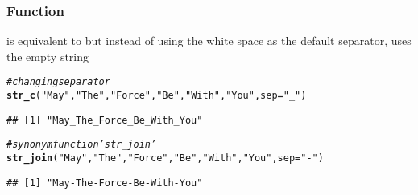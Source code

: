 \documentclass[12pt]{beamer}\usepackage[]{graphicx}\usepackage[]{color}
\makeatletter
\newcommand{\hlstr}[1]{\textcolor[rgb]{0.192,0.494,0.8}{#1}}%
\newcommand{\hlcom}[1]{\textcolor[rgb]{0.678,0.584,0.686}{\textit{#1}}}%
\newcommand{\hlstd}[1]{\textcolor[rgb]{0.345,0.345,0.345}{#1}}%
\newcommand{\hlkwc}[1]{\textcolor[rgb]{0.333,0.667,0.333}{#1}}%
\newcommand{\hlkwd}[1]{\textcolor[rgb]{0.737,0.353,0.396}{\textbf{#1}}}%
\newenvironment{kframe}{%
 \def\at@end@of@kframe{}%
 \ifinner\ifhmode%
  \def\at@end@of@kframe{\end{minipage}}%
  \begin{minipage}{\columnwidth}%
 \fi\fi%
 \def\FrameCommand##1{\hskip\@totalleftmargin \hskip-\fboxsep
 \colorbox{shadecolor}{##1}\hskip-\fboxsep
     \hskip-\linewidth \hskip-\@totalleftmargin \hskip\columnwidth}%
 \MakeFramed {\advance\hsize-\width
   \@totalleftmargin\z@ \linewidth\hsize
   \@setminipage}}%
 {\par\unskip\endMakeFramed%
 \at@end@of@kframe}
\newenvironment{knitrout}{}{} %
\makeatother
\begin{document}
\begin{frame}[fragile]
\frametitle{Function }

 is equivalent to  but instead of using the white space as the default separator,  uses the empty string 
\begin{knitrout}\footnotesize
{}\color{fgcolor}\begin{kframe}
\begin{alltt}
\hlcom{# changing separator}
\hlkwd{str_c}\hlstd{(}\hlstr{"May"}\hlstd{,} \hlstr{"The"}\hlstd{,} \hlstr{"Force"}\hlstd{,} \hlstr{"Be"}\hlstd{,} \hlstr{"With"}\hlstd{,} \hlstr{"You"}\hlstd{,} \hlkwc{sep}\hlstd{=}\hlstr{"_"}\hlstd{)}
\end{alltt}
\begin{verbatim}
## [1] "May_The_Force_Be_With_You"
\end{verbatim}
\begin{alltt}
\hlcom{# synonym function 'str_join'}
\hlkwd{str_join}\hlstd{(}\hlstr{"May"}\hlstd{,} \hlstr{"The"}\hlstd{,} \hlstr{"Force"}\hlstd{,} \hlstr{"Be"}\hlstd{,} \hlstr{"With"}\hlstd{,} \hlstr{"You"}\hlstd{,} \hlkwc{sep}\hlstd{=}\hlstr{"-"}\hlstd{)}
\end{alltt}


{\ttfamily\noindent{}}\begin{verbatim}
## [1] "May-The-Force-Be-With-You"
\end{verbatim}
\end{kframe}
\end{knitrout}

\end{frame}

\end{document}
